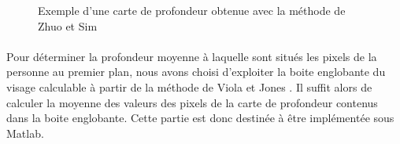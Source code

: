 \documentclass[11pt, french]{report-rd-info}
\begin{document}
\begin{figure}[htp]
 \centering
 \caption{Exemple d'une carte de profondeur obtenue avec la méthode de Zhuo et Sim \cite{Zhuo2011}}
 \label{fig:DefocusExemple}
\end{figure}


\paragraph*{}
Pour déterminer la profondeur moyenne à laquelle sont situés les pixels de la personne au premier plan, nous avons choisi d'exploiter la boite englobante du visage calculable à partir de la méthode de Viola et Jones \cite{Viola2004}. Il suffit alors de calculer la moyenne des valeurs des pixels de la carte de profondeur contenus dans la boite englobante. Cette partie est donc destinée à être implémentée sous Matlab.
\end{document}
